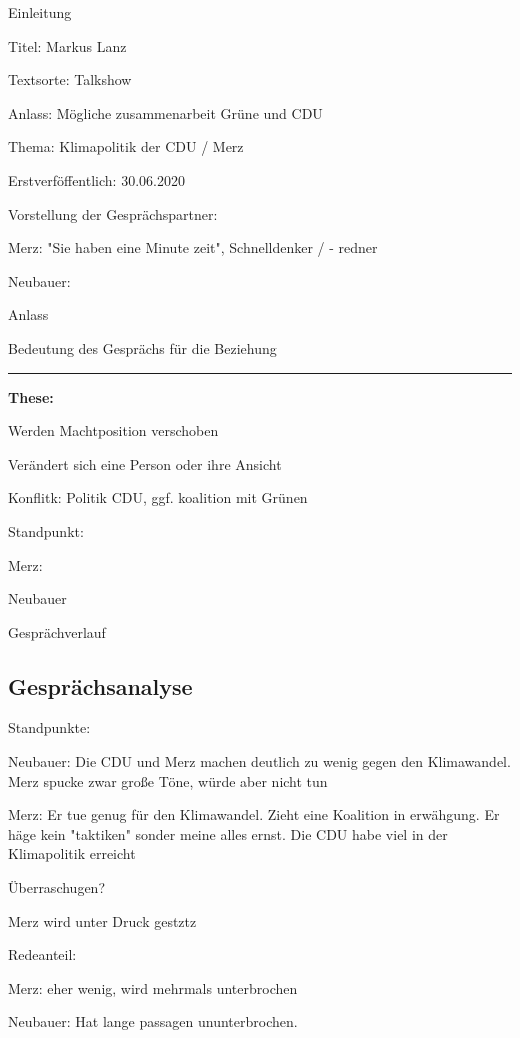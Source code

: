 \startitemize[packed]
\item Einleitung
\startitemize[packed]
\item Titel: Markus Lanz 
\item Textsorte: Talkshow
\item Anlass: Mögliche zusammenarbeit Grüne und CDU
\item Thema: Klimapolitik der CDU / Merz
\item Erstverföffentlich: 30.06.2020
\stopitemize
\item Vorstellung der Gesprächspartner:
\startitemize[packed]
\item Merz: "Sie haben eine Minute zeit", Schnelldenker / - redner
\item Neubauer: 
\stopitemize
\item Anlass
\item Bedeutung des Gesprächs für die Beziehung
\stopitemize

\blank
\hrule
\blank

\startframedtipp
{\bf These:}

\startitemize[packed]
\item Werden Machtposition verschoben
\item Verändert sich eine Person oder ihre Ansicht
\stopitemize
\stopframedtipp

\startitemize[packed]
\item Konflitk: Politik CDU, ggf. koalition mit Grünen
\item Standpunkt:
\startitemize[packed]
\item Merz: 
\item Neubauer
\stopitemize
\item Gesprächverlauf
\stopitemize

\subsection{Gesprächsanalyse}

\startitemize[packed]
\item Standpunkte:
\startitemize[packed]
\item Neubauer: Die CDU und Merz machen deutlich zu wenig gegen den Klimawandel. Merz spucke zwar große Töne, würde aber nicht tun
\item Merz: Er tue genug für den Klimawandel. Zieht eine Koalition in erwähgung. Er häge kein "taktiken" sonder meine alles ernst. Die CDU habe viel in der Klimapolitik erreicht
\stopitemize
\item Überraschugen?
\startitemize[packed]
\item Merz wird unter Druck gestztz
\item 
\stopitemize
\item Redeanteil:
\startitemize[packed]
\item Merz: eher wenig, wird mehrmals unterbrochen
\item Neubauer: Hat lange passagen ununterbrochen. 
\stopitemize
\stopitemize
